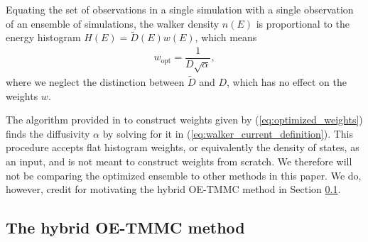 \documentclass[11pt]{article}
\renewcommand{\t}{\text} %
\newcommand{\f}[2]{\dfrac{#1}{#2}} %
\newcommand{\p}[1]{\left(#1\right)} %
\begin{document}
Equating the set of observations in a single simulation with a single
observation of an ensemble of simulations, the walker density $n\p{E}$
is proportional to the energy histogram $H\p{E}=\tilde D\p{E}w\p{E}$,
which means
\begin{align}
  w_{\t{opt}}=\f1{D\sqrt{\alpha}},
  \label{eq:optimized_weights}
\end{align}
where we neglect the distinction between $\tilde D$ and $D$, which has
no effect on the weights $w$.

The algorithm provided in \cite{optimized_ensemble} to construct
weights given by (\ref{eq:optimized_weights}) finds the diffusivity
$\alpha$ by solving for it in
(\ref{eq:walker_current_definition}). This procedure accepts flat
histogram weights, or equivalently the density of states, as an input,
and is not meant to construct weights from scratch. We therefore will
not be comparing the optimized ensemble to other methods in this
paper. We do, however, credit \cite{optimized_ensemble} for motivating
the hybrid OE-TMMC method in Section \ref{sec:oetmmc}.

\subsection{The hybrid OE-TMMC method}
\label{sec:oetmmc}
\end{document}
